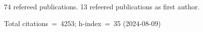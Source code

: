 74 refereed publications. 13 refeered publications as first author.

Total citations~=~4253; h-index~=~35 (2024-08-09)